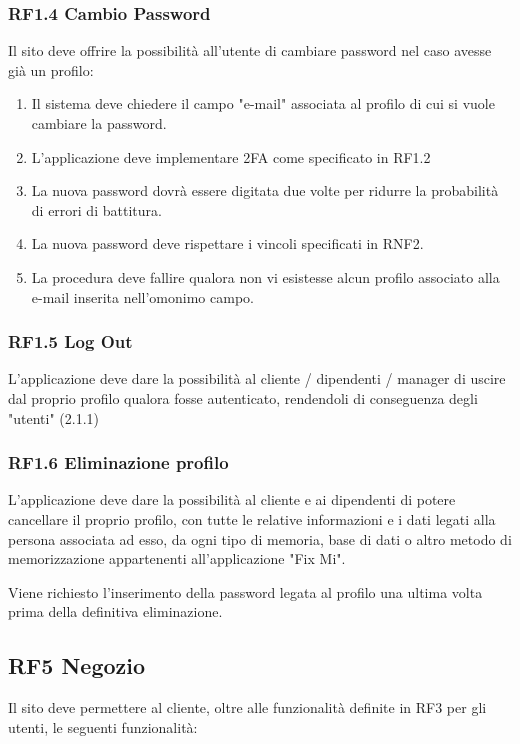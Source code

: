 \documentclass{report}
\begin{document}
\subsubsection*{RF1.4 Cambio Password}
Il sito deve offrire la possibilità all'utente di cambiare password nel caso avesse già un profilo:
\begin{enumerate}
	
	\item Il sistema deve chiedere il campo "e-mail" associata al profilo di cui si vuole cambiare la password.
	\item L'applicazione deve implementare 2FA come specificato in RF1.2
	\item La nuova password dovrà essere digitata due volte per ridurre la probabilità di errori di battitura.
	\item La nuova password deve rispettare i vincoli specificati in RNF2.
	\item La procedura deve fallire qualora non vi esistesse alcun profilo associato alla e-mail inserita nell'omonimo campo.
	
\end{enumerate}

\subsubsection{RF1.5 Log Out}

L'applicazione deve dare la possibilità al cliente / dipendenti / manager di uscire dal proprio profilo qualora fosse autenticato, rendendoli di conseguenza degli "utenti" (2.1.1)

\subsubsection{RF1.6 Eliminazione profilo}

L'applicazione deve dare la possibilità al cliente e ai dipendenti di potere cancellare il proprio profilo, con tutte le relative informazioni e i dati legati alla persona associata ad esso, da ogni tipo di memoria, base di dati o altro metodo di memorizzazione appartenenti all'applicazione "Fix Mi".

	\item Viene richiesto l'inserimento della password legata al profilo una ultima volta prima della definitiva eliminazione.

\subsection*{RF5 Negozio}
Il sito deve permettere al cliente, oltre alle funzionalità definite in RF3 per gli utenti, le seguenti funzionalità:
\end{document}
